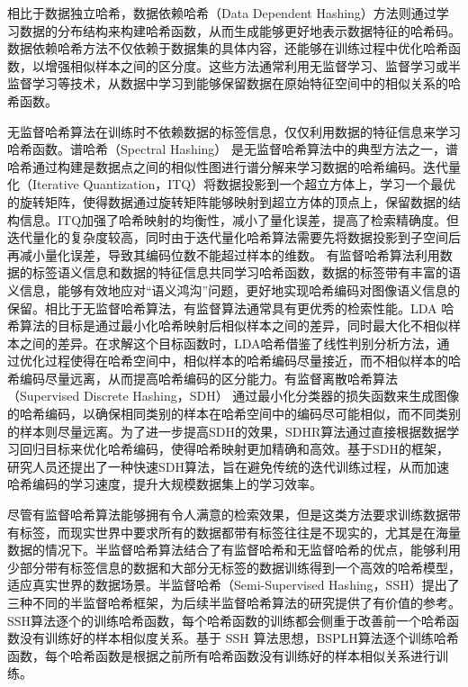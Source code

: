 相比于数据独立哈希，数据依赖哈希（Data Dependent Hashing）方法则通过学习数据的分布结构来构建哈希函数，从而生成能够更好地表示数据特征的哈希码。数据依赖哈希方法不仅依赖于数据集的具体内容，还能够在训练过程中优化哈希函数，以增强相似样本之间的区分度。这些方法通常利用无监督学习、监督学习或半监督学习等技术，从数据中学习到能够保留数据在原始特征空间中的相似关系的哈希函数。

无监督哈希算法在训练时不依赖数据的标签信息，仅仅利用数据的特征信息来学习哈希函数。谱哈希（Spectral Hashing） 是无监督哈希算法中的典型方法之一，谱哈希通过构建是数据点之间的相似性图进行谱分解来学习数据的哈希编码。迭代量化（Iterative Quantization，ITQ）将数据投影到一个超立方体上，学习一个最优的旋转矩阵，使得数据通过旋转矩阵能够映射到超立方体的顶点上，保留数据的结构信息。ITQ加强了哈希映射的均衡性，减小了量化误差，提高了检索精确度。但迭代量化的复杂度较高，同时由于迭代量化哈希算法需要先将数据投影到子空间后再减小量化误差，导致其编码位数不能超过样本的维数。
有监督哈希算法利用数据的标签语义信息和数据的特征信息共同学习哈希函数，数据的标签带有丰富的语义信息，能够有效地应对“语义鸿沟”问题，更好地实现哈希编码对图像语义信息的保留。相比于无监督哈希算法，有监督算法通常具有更优秀的检索性能。LDA 哈希算法的目标是通过最小化哈希映射后相似样本之间的差异，同时最大化不相似样本之间的差异。在求解这个目标函数时，LDA哈希借鉴了线性判别分析方法，通过优化过程使得在哈希空间中，相似样本的哈希编码尽量接近，而不相似样本的哈希编码尽量远离，从而提高哈希编码的区分能力。有监督离散哈希算法（Supervised Discrete Hashing，SDH） 通过最小化分类器的损失函数来生成图像的哈希编码，以确保相同类别的样本在哈希空间中的编码尽可能相似，而不同类别的样本则尽量远离。为了进一步提高SDH的效果，SDHR算法通过直接根据数据学习回归目标来优化哈希编码，使得哈希映射更加精确和高效。基于SDH的框架，研究人员还提出了一种快速SDH算法，旨在避免传统的迭代训练过程，从而加速哈希编码的学习速度，提升大规模数据集上的学习效率。

尽管有监督哈希算法能够拥有令人满意的检索效果，但是这类方法要求训练数据带有标签，而现实世界中要求所有的数据都带有标签往往是不现实的，尤其是在海量数据的情况下。半监督哈希算法结合了有监督哈希和无监督哈希的优点，能够利用少部分带有标签信息的数据和大部分无标签的数据训练得到一个高效的哈希模型，适应真实世界的数据场景。半监督哈希（Semi-Supervised Hashing，SSH）提出了三种不同的半监督哈希框架，为后续半监督哈希算法的研究提供了有价值的参考。SSH算法逐个的训练哈希函数，每个哈希函数的训练都会侧重于改善前一个哈希函数没有训练好的样本相似度关系。基于 SSH 算法思想，BSPLH算法逐个训练哈希函数，每个哈希函数是根据之前所有哈希函数没有训练好的样本相似关系进行训练。

